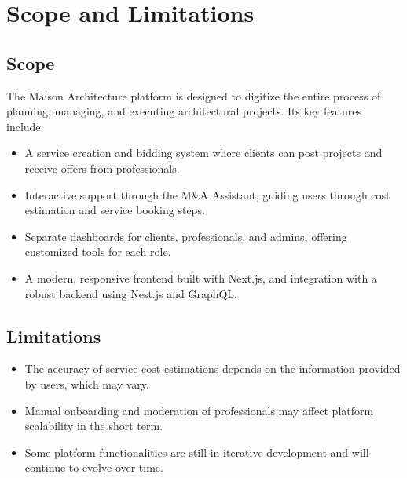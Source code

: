 \section{Scope and Limitations}

\subsection{Scope}
The Maison Architecture platform is designed to digitize the entire process of planning, managing, and executing architectural projects. Its key features include:
\begin{itemize}
    \item A service creation and bidding system where clients can post projects and receive offers from professionals.
    \item Interactive support through the M\&A Assistant, guiding users through cost estimation and service booking steps.
    \item Separate dashboards for clients, professionals, and admins, offering customized tools for each role.
    \item A modern, responsive frontend built with Next.js, and integration with a robust backend using Nest.js and GraphQL.
\end{itemize}

\newpage
\subsection{Limitations}
\begin{itemize}
    \item The accuracy of service cost estimations depends on the information provided by users, which may vary.
    \item Manual onboarding and moderation of professionals may affect platform scalability in the short term.
    \item Some platform functionalities are still in iterative development and will continue to evolve over time.
\end{itemize}

